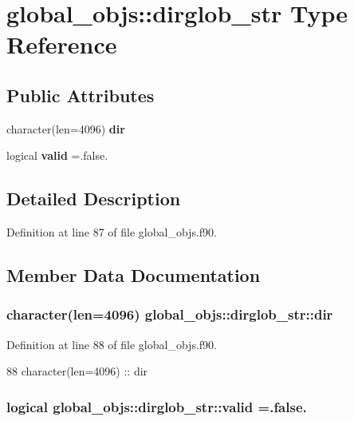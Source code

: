\section{global\+\_\+objs\+:\+:dirglob\+\_\+str Type Reference}
\label{structglobal__objs_1_1dirglob__str}
\subsection*{Public Attributes}
\begin{DoxyCompactItemize}
\item 
character(len=4096) {\bf dir}
\item 
logical {\bf valid} =.false.
\end{DoxyCompactItemize}


\subsection{Detailed Description}


Definition at line 87 of file global\+\_\+objs.\+f90.



\subsection{Member Data Documentation}
\subsubsection[{dir}]{\setlength{\rightskip}{0pt plus 5cm}character(len=4096) global\+\_\+objs\+::dirglob\+\_\+str\+::dir}\label{structglobal__objs_1_1dirglob__str_ae1717e112187db6298d410e415508200}


Definition at line 88 of file global\+\_\+objs.\+f90.


\begin{DoxyCode}
88     \textcolor{keywordtype}{character(len=4096)} :: dir
\end{DoxyCode}
\subsubsection[{valid}]{\setlength{\rightskip}{0pt plus 5cm}logical global\+\_\+objs\+::dirglob\+\_\+str\+::valid =.false.}\label{structglobal__objs_1_1dirglob__str_ac643bc95db13d3e0d3df33809065a2ac}


